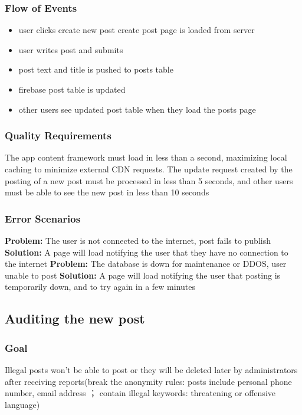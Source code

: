\documentclass[12pt]{article}
\begin{document}
\subsubsection{Flow of Events}
\begin{itemize}
  \item user clicks create new post create post page is loaded from server
  \item user writes post and submits
  \item post text and title is pushed to posts table
  \item firebase post table is updated
  \item other users see updated post table when they load the posts page
\end{itemize}

\subsubsection{Quality Requirements}
The app content framework must load in less than a second, maximizing local caching to minimize external CDN requests.
The update request created by the posting of a new post must be processed in less than 5 seconds, and other users must be able to see the new post in less than 10 seconds


\subsubsection{Error Scenarios}
\textbf{Problem:}
 The user is not connected to the internet, post fails to publish
\textbf{Solution:}
  A page will load notifying the user that they have no connection to the internet
\textbf{Problem:}
  The database is down for maintenance or DDOS, user unable to post
\textbf{Solution:}
  A page will load notifying the user that posting is temporarily down, and to try again in a few minutes

\subsection{Auditing the new post}

  \subsubsection{Goal}
  Illegal posts won’t be able to post or they will be deleted later by administrators after receiving reports(break the anonymity rules: posts include personal phone number, email address ； contain illegal keywords: threatening or offensive language)
\end{document}
